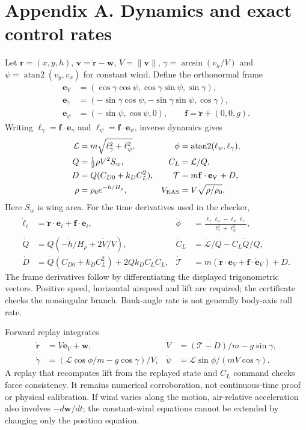 \appendix
\section{Appendix A. Dynamics and exact control rates}\label{app:dynamics}
Let $\mathbf r=(x,y,h)$, $\mathbf v=\dot{\mathbf r}-\mathbf w$, $V=\|\mathbf v\|$, $\gamma=\arcsin(v_h/V)$ and $\psi=\operatorname{atan2}(v_y,v_x)$ for constant wind. Define the orthonormal frame
\begin{align}
\mathbf e_V&=(\cos\gamma\cos\psi,\cos\gamma\sin\psi,\sin\gamma),\\
\mathbf e_\gamma&=(-\sin\gamma\cos\psi,-\sin\gamma\sin\psi,\cos\gamma),\\
\mathbf e_\psi&=(-\sin\psi,\cos\psi,0),\qquad \mathbf f=\ddot{\mathbf r}+(0,0,g).
\end{align}
Writing $\ell_\gamma=\mathbf f\cdot\mathbf e_\gamma$ and $\ell_\psi=\mathbf f\cdot\mathbf e_\psi$, inverse dynamics gives
\begin{align}
\mathcal L&=m\sqrt{\ell_\gamma^2+\ell_\psi^2}, &\phi&=\operatorname{atan2}(\ell_\psi,\ell_\gamma),\\
Q&=\tfrac12\rho V^2S_w, & C_L&=\mathcal L/Q,\\
D&=Q(C_{D0}+k_D C_L^2), &\mathcal T&=m\mathbf f\cdot\mathbf e_V+D,\\
\rho&=\rho_0e^{-h/H_\rho}, &V_{\rm EAS}&=V\sqrt{\rho/\rho_0}.
\end{align}
Here $S_w$ is wing area. For the time derivatives used in the checker,
\begin{align}
\dot\ell_i&=\dddot{\mathbf r}\cdot\mathbf e_i+\mathbf f\cdot\dot{\mathbf e}_i,
&\dot\phi&=\frac{\ell_\gamma\dot\ell_\psi-\ell_\psi\dot\ell_\gamma}{\ell_\gamma^2+\ell_\psi^2},\\
\dot Q&=Q(-\dot h/H_\rho+2\dot V/V),
&\dot C_L&=\dot{\mathcal L}/Q-C_L\dot Q/Q,\\
\dot D&=\dot Q(C_{D0}+k_DC_L^2)+2Qk_DC_L\dot C_L,
&\dot{\mathcal T}&=m(\dddot{\mathbf r}\cdot\mathbf e_V+\mathbf f\cdot\dot{\mathbf e}_V)+\dot D.
\end{align}
The frame derivatives follow by differentiating the displayed trigonometric vectors. Positive speed, horizontal airspeed and lift are required; the certificate checks the nonsingular branch. Bank-angle rate is not generally body-axis roll rate.

Forward replay integrates
\begin{align}
\dot{\mathbf r}&=V\mathbf e_V+\mathbf w,&\dot V&=(\mathcal T-D)/m-g\sin\gamma,\\
\dot\gamma&=(\mathcal L\cos\phi/m-g\cos\gamma)/V,&
\dot\psi&=\mathcal L\sin\phi/(mV\cos\gamma).
\end{align}
A replay that recomputes lift from the replayed state and $C_L$ command checks force consistency. It remains numerical corroboration, not continuous-time proof or physical calibration. If wind varies along the motion, air-relative acceleration also involves $-d\mathbf w/dt$; the constant-wind equations cannot be extended by changing only the position equation.

